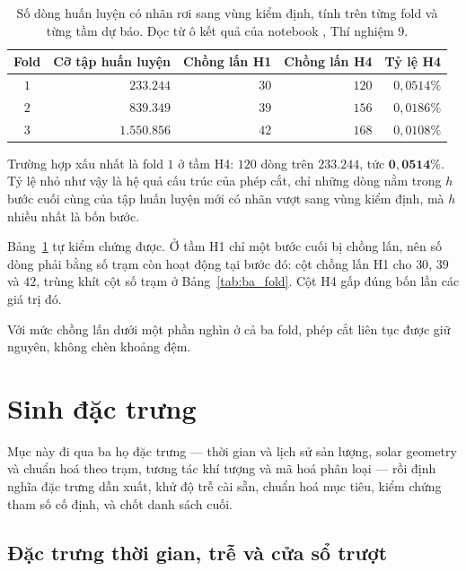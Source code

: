 \begin{table}[htbp]
\centering

\small
\begin{tabular}{c r r r r}
\toprule
\textbf{Fold} & \textbf{Cỡ tập huấn luyện} & \textbf{Chồng lấn H1} & \textbf{Chồng lấn H4} & \textbf{Tỷ lệ H4} \\
\midrule
$1$ & $233.244$ & $30$ & $120$ & $0{,}0514\%$ \\
$2$ & $839.349$ & $39$ & $156$ & $0{,}0186\%$ \\
$3$ & $1.550.856$ & $42$ & $168$ & $0{,}0108\%$ \\
\bottomrule
\end{tabular}
\caption[Số dòng huấn luyện có nhãn rơi sang vùng kiểm định, tính trên từng fold và từng tầm dự báo]{Số dòng huấn luyện có nhãn rơi sang vùng kiểm định, tính trên từng fold và
từng tầm dự báo. Đọc từ ô kết quả của notebook
, Thí nghiệm $9$.}
\label{tab:chong_lan}
\end{table}

Trường hợp xấu nhất là fold $1$ ở tầm H4: $120$ dòng trên $233.244$, tức
$\mathbf{0{,}0514\%}$. Tỷ lệ nhỏ như vậy là hệ quả cấu trúc của phép cắt, chỉ những dòng
nằm trong $h$ bước cuối cùng của tập huấn luyện mới có nhãn vượt sang vùng kiểm định, mà
$h$ nhiều nhất là bốn bước.

Bảng~\ref{tab:chong_lan} tự kiểm chứng được. Ở tầm H1 chỉ một bước cuối bị chồng
lấn, nên số dòng phải bằng số trạm còn hoạt động tại bước đó: cột chồng lấn H1 cho $30$,
$39$ và $42$, trùng khít cột số trạm ở Bảng~\ref{tab:ba_fold}. Cột H4 gấp đúng bốn lần các
giá trị đó.

Với mức chồng lấn dưới một phần nghìn ở cả ba fold, phép cắt liên tục được giữ nguyên,
không chèn khoảng đệm.

\FloatBarrier
\section{Sinh đặc trưng}

Mục này đi qua ba họ đặc trưng --- thời gian và lịch sử sản lượng, solar geometry và chuẩn
hoá theo trạm, tương tác khí tượng và mã hoá phân loại --- rồi định nghĩa đặc trưng dẫn xuất,
khử độ trễ cài sẵn, chuẩn hoá mục tiêu, kiểm chứng tham số cố định, và chốt danh sách cuối.

\FloatBarrier
\subsection{Đặc trưng thời gian, trễ và cửa sổ trượt}

